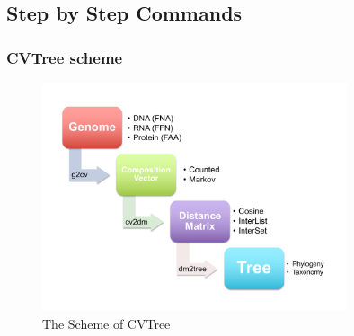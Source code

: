 \documentclass[a4paper,12pt]{article}
\begin{document}
\subsection{Step by Step Commands}
\subsubsection{CVTree scheme}
\begin{figure}[h]
	\centering
	\includegraphics[width=0.8\textwidth]{Scheme}
	\caption{The Scheme of CVTree}
\end{figure}
\end{document}
